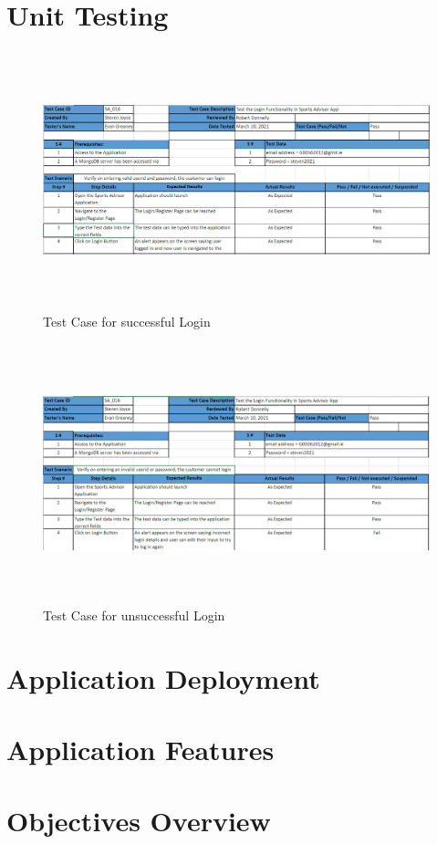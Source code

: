 \section{Unit Testing}
\begin{figure}[H]
    \centering
    \includegraphics[width=15cm, height = 7.5cm]{img/TestCasePass.PNG}
    \caption{Test Case for successful Login}
    \label{fig:altas config}
\end{figure}

\begin{figure}[H]
    \centering
    \includegraphics[width=15cm, height = 7.5cm]{img/TestCaseFail.PNG}
    \caption{Test Case for unsuccessful Login}
    \label{fig:altas config}
\end{figure}
\section{Application Deployment}
\section{Application Features}
\section{Objectives Overview}
